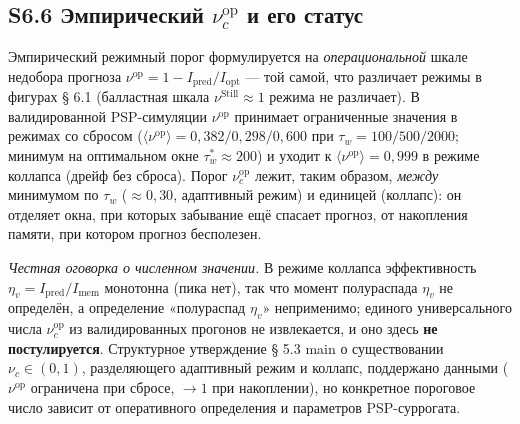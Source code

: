 \documentclass[pdflatex,sn-mathphys-ay]{sn-jnl}
\begin{document}
\subsection*{\texorpdfstring{S6.6 Эмпирический \(\nu_c^{\text{op}}\) и его статус}{S6.6 Эмпирический \textbackslash nu\_c\^{}\{\textbackslash text\{op\}\} и его статус}}\label{s6.6-ux44dux43cux43fux438ux440ux438ux447ux435ux441ux43aux438ux439-nu_ctextop-ux438-ux435ux433ux43e-ux441ux442ux430ux442ux443ux441}



Эмпирический режимный порог формулируется на \emph{операциональной} шкале недобора прогноза \(\nu^{\text{op}} = 1 - I_{\text{pred}}/I_{\text{opt}}\) --- той самой, что различает режимы в фигурах § 6.1 (балластная шкала \(\nu^{\text{Still}} \approx 1\) режима не различает). В валидированной PSP-симуляции \(\nu^{\text{op}}\) принимает ограниченные значения в режимах со сбросом (\(\langle\nu^{\text{op}}\rangle = 0{,}382 / 0{,}298 / 0{,}600\) при \(\tau_w = 100 / 500 / 2000\); минимум на оптимальном окне \(\tau_w^* \approx 200\)) и уходит к \(\langle\nu^{\text{op}}\rangle = 0{,}999\) в режиме коллапса (дрейф без сброса). Порог \(\nu_c^{\text{op}}\) лежит, таким образом, \emph{между} минимумом по \(\tau_w\) (\(\approx 0{,}30\), адаптивный режим) и единицей (коллапс): он отделяет окна, при которых забывание ещё спасает прогноз, от накопления памяти, при котором прогноз бесполезен.



\emph{Честная оговорка о численном значении.} В режиме коллапса эффективность \(\eta_v = I_{\text{pred}}/I_{\text{mem}}\) монотонна (пика нет), так что момент полураспада \(\eta_v\) не определён, а определение «полураспад \(\eta_v\)» неприменимо; единого универсального числа \(\nu_c^{\text{op}}\) из валидированных прогонов не извлекается, и оно здесь \textbf{не постулируется}. Структурное утверждение § 5.3 main о существовании \(\nu_c \in (0,1)\), разделяющего адаптивный режим и коллапс, поддержано данными (\(\nu^{\text{op}}\) ограничена при сбросе, \(\to 1\) при накоплении), но конкретное пороговое число зависит от оперативного определения и параметров PSP-суррогата.
\end{document}
